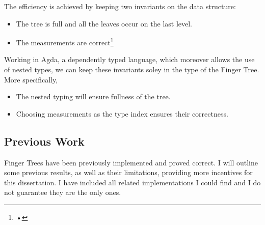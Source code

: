 \documentclass[12pt,twoside,notitlepage]{report}
\begin{document}
The efficiency is achieved by keeping two invariants on the data structure:
\begin{itemize}
	\item The tree is full and all the leaves occur on the last level. 
	\item The measurements are correct\footnote{•}
\end{itemize}

Working in Agda, a dependently typed language, which moreover allows the use of nested types, we can keep these invariants soley in the type of the Finger Tree. More specifically,
\begin{itemize}
	\item The nested typing will ensure fullness of the tree.
	\item Choosing measurements as the type index ensures their correctness.  
\end{itemize} 

\subsection{Previous Work}

Finger Trees have been previously implemented and proved correct. I will outline some previous results, as well as their limitations, providing more incentives for this dissertation. I have included all related implementations I could find and I do not guarantee they are the only ones.
\end{document}
